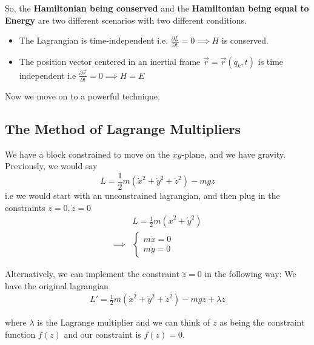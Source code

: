 \documentclass[11pt]{article}
\begin{document}
\vskip 0.25cm
So, the \textbf{Hamiltonian being conserved} and the \textbf{Hamiltonian being equal to Energy} are two different scenarios with two different conditions.

\begin{redbox}
  \begin{itemize}
    \item The Lagrangian is time-independent i.e. $\frac{\partial L}{\partial t} = 0 \implies H$ is conserved. 
    \item The position vector centered in an inertial frame $\vec{r} = \vec{r}(q_k, t)$ is time independent i.e $\frac{\partial \vec{r}}{\partial t} = 0 \implies H = E$
  \end{itemize}
\end{redbox}

\vskip 0.5cm
Now we move on to a powerful technique.

\vskip 1cm
\subsection{The Method of Lagrange Multipliers}

\vskip 0.5cm

\vskip 0.5cm
We have a block constrained to move on the $xy$-plane, and we have gravity. Previously, we would say 
\[ L = \frac{1}{2} m \left( \dot{x}^2 + \dot{y}^2 + \dot{z}^2\right) - mgz \] i.e we would start with an unconstrained lagrangian, and then plug in the constraints $z = 0, \dot{z} = 0$
\begin{align*}
  &L = \frac{1}{2}m(\dot{x}^2 + \dot{y}^2) \\
  \implies & \begin{cases}
    m \ddot{x} = 0 \\
    m \ddot{y} = 0
  \end{cases} 
\end{align*}

\vskip 0.5cm
Alternatively, we can implement the constraint $\ddot{z} = 0$ in the following way: We have the original lagrangian
\begin{align*}
  L' = \frac{1}{2} m \left( \dot{x}^2 + \dot{y}^2 + \dot{z}^2\right) - mgz + \lambda z
\end{align*}

where $\lambda$ is the Lagrange multiplier and we can think of $z$ as being the constraint function $f(z)$ and our constraint is $f(z) = 0$.
\end{document}
